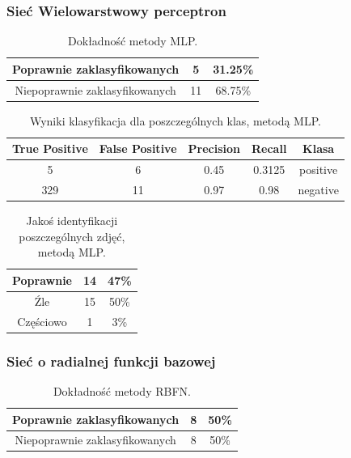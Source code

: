 \documentclass{classrep}
\begin{document}
\subsubsection{Sieć Wielowarstwowy perceptron}

\begin{table}[H]
\centering
\begin{tabular}{|c|c|c|}
\hline 
Poprawnie zaklasyfikowanych & 5 & 31.25\% \\ 
\hline 
Niepoprawnie zaklasyfikowanych & 11 & 68.75\% \\ 
\hline 
\end{tabular} 
\caption{Dokładność metody MLP.}
\label{wyniki:mlptest}
\end{table}



\begin{table}[H]
\centering
\begin{tabular}{|c|c|c|c|c|}
\hline 
True Positive  &  False Positive & Precision &  Recall &  Klasa \\
\hline
5    &   6   &   0.45  &    0.3125  &  positive \\
\hline
329    &  11  &    0.97  &   0.98  & negative \\
\hline 
\end{tabular} 
\caption{Wyniki klasyfikacja dla poszczególnych klas, metodą MLP.}
\label{wyniki:mlptestclass}
\end{table}

\begin{table}[H]
\centering
\begin{tabular}{|c|c|c|}
\hline 
Poprawnie & 14 & 47\% \\ 
\hline 
Źle & 15 & 50\% \\
\hline 
Częściowo & 1 & 3\% \\ 
\hline 
\end{tabular} 
\caption{Jakoś identyfikacji poszczególnych zdjęć, metodą MLP.}
\label{wyniki:mlpImagetest}
\end{table}
\subsubsection{Sieć o radialnej funkcji bazowej}


\begin{table}[H]
\centering
\begin{tabular}{|c|c|c|}
\hline 
Poprawnie zaklasyfikowanych & 8 & 50\% \\ 
\hline 
Niepoprawnie zaklasyfikowanych & 8 & 50\% \\
\hline 
\end{tabular} 
\caption{Dokładność metody RBFN.}
\label{wyniki:rbftest}
\end{table}
\end{document}
